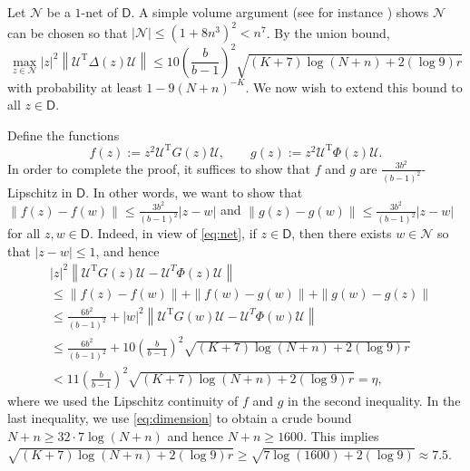 \documentclass[reqno]{amsart}
\newcommand{\T}{\mathrm{T}}
\theoremstyle{plain}
\theoremstyle{definition}
\begin{document}
Let $\mathcal{N}$ be a $1$-net of $\mathsf D$.  A simple volume argument (see for instance \cite[Lemma 3.3]{OW}) shows $\mathcal{N}$ can be chosen so that $|\mathcal{N}| \leq  (1+8n^3)^2 <n^7$. 
By the union bound, 
\begin{equation} \label{eq:net}
	\max_{ z \in \mathcal{N}} |z|^2 \left\| \mathcal U^\T \Delta(z) \mathcal U \right\| \leq 10 \left(\frac{b}{b-1} \right)^2 \sqrt{(K+7)\log (N+n)+2(\log 9) r}
\end{equation} 
with probability at least $1 - 9(N+n)^{-K}$.  We now wish to extend this bound to all $z \in \mathsf D$.  

Define the functions
\[ f(z) := z^2 \mathcal U^\T G(z) \mathcal U, \qquad g(z) := z^2\mathcal U^\T \Phi(z) \mathcal U. \]
In order to complete the proof, it suffices to show that $f$ and $g$ are $\frac{3b^2}{(b-1)^2}$-Lipschitz in $\mathsf D$.  In other words, we want to show that $\| f(z) - f(w)\| \leq \frac{3b^2}{(b-1)^2} |z-w|$ and $\| g(z) - g(w)\| \leq \frac{3b^2}{(b-1)^2} |z-w|$ for all $z,w \in \mathsf D$.  Indeed, in view of \eqref{eq:net}, if $z \in \mathsf D$, then there exists $w \in \mathcal{N}$ so that $|z - w| \leq 1$, and hence \begin{align*}
	&|z|^2 \left\| \mathcal U^\T G(z) \mathcal U - \mathcal U^T \Phi(z) \mathcal U \right\| \\
	&
	\le \|f(z) - f(w)\| +\|f(w) - g(w)\| + \|g(w) - g(z)\| \\
	&\leq \frac{6 b^2}{(b-1)^2} + |w|^2 \left\| \mathcal U^\T G(w) \mathcal U - \mathcal U^T \Phi(w) \mathcal U \right\| \\
	&\leq \frac{6 b^2}{(b-1)^2} + 10\left(\frac{b}{b-1} \right)^2 \sqrt{(K+7)\log (N+n)+2(\log 9) r}  \\
	&<  11\left(\frac{b}{b-1} \right)^2 \sqrt{(K+7)\log (N+n)+2(\log 9) r}=\eta,  
\end{align*}
 where we used the Lipschitz continuity of $f$ and $g$ in the second inequality. In the last inequality, we use \eqref{eq:dimension} to obtain a crude bound $N+n\ge 32\cdot 7 \log(N+n)$ and hence $N+n\ge 1600$. This implies $\sqrt{(K+7)\log (N+n)+2(\log 9) r} \ge \sqrt{7\log (1600)+2(\log 9) }\approx 7.5$. 
 
\end{document}
